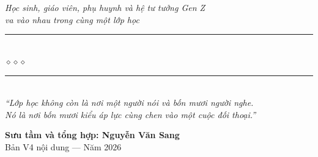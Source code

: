 \begin{titlepage}
\begin{center}
  {\fontsize{15}{19}\selectfont\color{bookprimary!90!black}\itshape
    Học sinh, giáo viên, phụ huynh và hệ tư tưởng Gen Z\\
    va vào nhau trong cùng một lớp học}\\[0.95cm]

  {\color{bookprimary!55}\rule{7cm}{1pt}}\\[5pt]
  {\color{booksecondary!80!black}\large$\diamond$\hspace{1cm}$\diamond$\hspace{1cm}$\diamond$}\\[5pt]
  {\color{bookprimary!55}\rule{7cm}{1pt}}\\[1.3cm]

  {\normalsize\itshape\color{bookprimary!90!black}
   ``Lớp học không còn là nơi một người nói và bốn mươi người nghe.\\
   Nó là nơi bốn mươi kiểu áp lực cùng chen vào một cuộc đối thoại.''}

  \vfill

  {\fontsize{16}{20}\selectfont\bfseries\color{bookprimary!90!black}
    Sưu tầm và tổng hợp: \textbf{Nguyễn Văn Sang}}\\[0.4cm]
  {\small\color{gray} Bản V4 nội dung --- Năm 2026}\\[0.5cm]
\end{center}

\afterpage{\nopagecolor}
\end{titlepage}